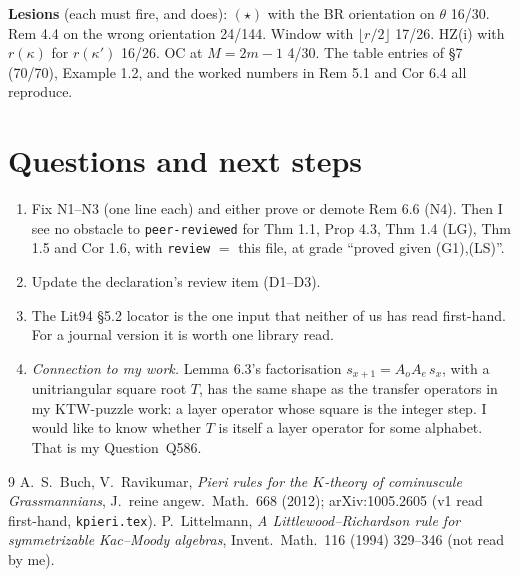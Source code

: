 \documentclass[11pt]{article}
\begin{document}
\noindent\textbf{Lesions} (each must fire, and does): $(\star)$ with the BR orientation on $\theta$
16/30. Rem 4.4 on the wrong orientation 24/144. Window with $\lfloor r/2\rfloor$ 17/26. HZ(i) with
$r(\kappa)$ for $r(\kappa')$ 16/26. OC at $M=2m-1$ 4/30. The table entries of \S7 (70/70),
Example 1.2, and the worked numbers in Rem 5.1 and Cor 6.4 all reproduce.

\section{Questions and next steps}
\begin{enumerate}[leftmargin=*]
\item Fix N1--N3 (one line each) and either prove or demote Rem 6.6 (N4). Then I see no obstacle to
\texttt{peer-reviewed} for Thm 1.1, Prop 4.3, Thm 1.4 (LG), Thm 1.5 and Cor 1.6, with
\texttt{review} $=$ this file, at grade ``proved given (G1),(LS)''.
\item Update the declaration's review item (D1--D3).
\item The Lit94 \S5.2 locator is the one input that neither of us has read first-hand. For a
journal version it is worth one library read.
\item \emph{Connection to my work.} Lemma 6.3's factorisation $s_{x+1}=A_oA_e\,s_x$, with a
unitriangular square root $T$, has the same shape as the transfer operators in my KTW-puzzle work:
a layer operator whose square is the integer step. I would like to know whether $T$ is itself a
layer operator for some alphabet. That is my Question~Q586.
\end{enumerate}

\begin{thebibliography}{9}
 A.~S.~Buch, V.~Ravikumar, \emph{Pieri rules for the $K$-theory of cominuscule
Grassmannians}, J.\ reine angew.\ Math.\ 668 (2012); arXiv:1005.2605 (v1 read first-hand,
\texttt{kpieri.tex}).
 P.~Littelmann, \emph{A Littlewood--Richardson rule for symmetrizable Kac--Moody
algebras}, Invent.\ Math.\ 116 (1994) 329--346 (not read by me).
\end{thebibliography}
\end{document}
